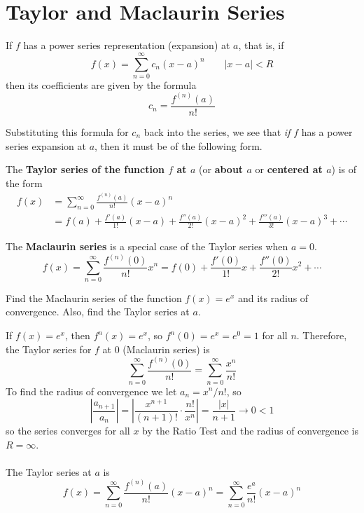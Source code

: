 \section{Taylor and Maclaurin Series}
  \begin{theorem}
    If $f$ has a power series representation (expansion) at $a$, that is, if
    $$ f(x) = \sum_{n=0}^{\infty} c_n (x-a)^n \qquad |x-a|<R $$
    then its coefficients are given by the formula
    $$ c_n = \frac{f^{(n)}(a)}{n!} $$
  \end{theorem}
  Substituting this formula for $c_n$ back into the series, we see that \textit{if} $f$ has a power series expansion at $a$, then it must be of the following form.
  \begin{definition}
    The \textbf{Taylor series of the function $f$ at $a$} (or \textbf{about $a$} or \textbf{centered at $a$}) is of the form
    \begin{align*}
      f(x) &= \sum_{n=0}^{\infty} \frac{f^{(n)}(a)}{n!} (x-a)^n \\
      &= f(a) + \frac{f'(a)}{1!}(x-a) + \frac{f''(a)}{2!}(x-a)^2 + \frac{f'''(a)}{3!}(x-a)^3 + \cdots
    \end{align*}
  \end{definition}
  \begin{definition}
    The \textbf{Maclaurin series} is a special case of the Taylor series when $a=0$.
    $$ f(x) = \sum_{n=0}^{\infty} \frac{f^{(n)}(0)}{n!} x^n = f(0) + \frac{f'(0)}{1!}x + \frac{f''(0)}{2!}x^2 + \cdots $$
  \end{definition}
  \begin{example}
    Find the Maclaurin series of the function $f(x)=e^x$ and its radius of convergence. Also, find the Taylor series at $a$.
  \end{example}
  \begin{solution}
    If $f(x)=e^x$, then $f^{n}(x)=e^x$, so $f^{n}(0)=e^x = e^0 = 1$ for all $n$. Therefore, the Taylor series for $f$ at 0 (Maclaurin series) is
    $$\sum_{n=0}^{\infty} \frac{f^{(n)}(0)}{n!} = \sum_{n=0}^{\infty} \frac{x^n}{n!} $$
    To find the radius of convergence we let $a_n = x^n/n!$, so
    $$ \left| \frac{a_{n+1}}{a_n} \right| = \left| \frac{x^{n+1}}{(n+1)!} \cdot \frac{n!}{x^n}\right| = \frac{|x|}{n+1} \to 0 < 1 $$
    so the series converges for all $x$ by the Ratio Test and the radius of convergence is $R=\infty$.
    \\~\\
    The Taylor series at $a$ is $$f(x) = \sum_{n=0}^{\infty} \frac{f^{(n)}(a)}{n!}(x-a)^n = \sum_{n=0}^{\infty} \frac{e^a}{n!}(x-a)^n $$
  \end{solution}
